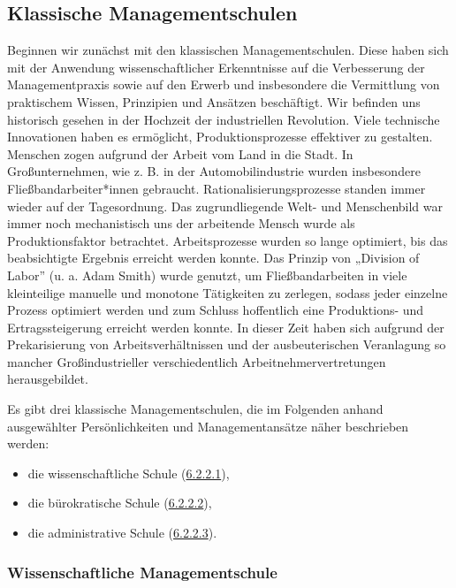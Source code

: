 \documentclass[
  letterpaper,
]{book}
\begin{document}
\subsection{Klassische
Managementschulen}\label{klassische-managementschule}

Beginnen wir zunächst mit den klassischen Managementschulen. Diese haben
sich mit der Anwendung wissenschaftlicher Erkenntnisse auf die
Verbesserung der Managementpraxis sowie auf den Erwerb und insbesondere
die Vermittlung von praktischem Wissen, Prinzipien und Ansätzen
beschäftigt. Wir befinden uns historisch gesehen in der Hochzeit der
industriellen Revolution. Viele technische Innovationen haben es
ermöglicht, Produktionsprozesse effektiver zu gestalten. Menschen zogen
aufgrund der Arbeit vom Land in die Stadt. In Großunternehmen, wie z. B.
in der Automobilindustrie wurden insbesondere Fließbandarbeiter*innen
gebraucht. Rationalisierungsprozesse standen immer wieder auf der
Tagesordnung. Das zugrundliegende Welt- und Menschenbild war immer noch
mechanistisch uns der arbeitende Mensch wurde als Produktionsfaktor
betrachtet. Arbeitsprozesse wurden so lange optimiert, bis das
beabsichtigte Ergebnis erreicht werden konnte. Das Prinzip von „Division
of Labor'' (u. a. Adam Smith) wurde genutzt, um Fließbandarbeiten in
viele kleinteilige manuelle und monotone Tätigkeiten zu zerlegen, sodass
jeder einzelne Prozess optimiert werden und zum Schluss hoffentlich eine
Produktions- und Ertragssteigerung erreicht werden konnte. In dieser
Zeit haben sich aufgrund der Prekarisierung von Arbeitsverhältnissen und
der ausbeuterischen Veranlagung so mancher Großindustrieller
verschiedentlich Arbeitnehmervertretungen herausgebildet.

Es gibt drei klassische Managementschulen, die im Folgenden anhand
ausgewählter Persönlichkeiten und Managementansätze näher beschrieben
werden:

\begin{itemize}
\item
  die wissenschaftliche Schule
  (\hyperref[wissenschaftliche-managementschule]{6.2.2.1}),
\item
  die bürokratische Schule
  (\hyperref[buerokratische-managementschule]{6.2.2.2}),
\item
  die administrative Schule
  (\hyperref[administrative-managementschule]{6.2.2.3}).
\end{itemize}

\subsubsection{Wissenschaftliche
Managementschule}\label{wissenschaftliche-managementschule}
\end{document}
